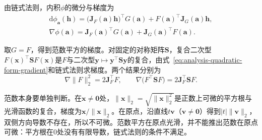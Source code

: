 由链式法则，内积$\phi$的微分与梯度为
\begin{equation}
 \begin{gathered}
 \mathrm d\phi_{\bm a}(\bm h)=\bigl(\bm J_F(\bm a)\bm h\bigr)^\top G(\bm a)+F(\bm a)^\top\bm J_G(\bm a)\bm h,\\
 \nabla\phi(\bm a)=\bm J_F(\bm a)^\top G(\bm a)+\bm J_G(\bm a)^\top F(\bm a).
 \end{gathered}
\label{eq:multivariable-inner-product-gradient}
\end{equation}

取$G=F$，得到范数平方的梯度。对固定的对称矩阵$\bm S$，复合二次型$F(\bm x)^\top\bm SF(\bm x)$是$F$与二次型$\bm y\mapsto\bm y^\top\bm S\bm y$的复合，由式~\eqref{eq:analysis-quadratic-form-gradient}和链式法则求梯度。两个结果分别为
\[
 \nabla\lVert F\rVert_2^2=2\bm J_F^\top F,\qquad\nabla\bigl(F^\top\bm SF\bigr)=2\bm J_F^\top\bm SF.
\]

范数本身要单独判断。在$\bm x\neq\bm0$处，$\lVert\bm x\rVert_2=\sqrt{\lVert\bm x\rVert_2^2}$是正数上可微的平方根与光滑函数的复合，梯度为$\bm x/\lVert\bm x\rVert_2$。在原点，沿直线$t\bm v$（$\bm v\neq\bm0$）得到$|t|\lVert\bm v\rVert_2$，双侧方向导数不存在，所以不可微。范数平方在原点光滑，并不能推出范数在原点可微：平方根在$0$处没有有限导数，链式法则的条件不满足。


